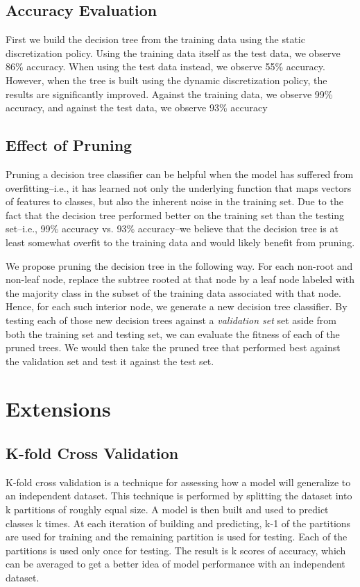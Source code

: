 \documentclass[12pt, conference, compsocconf]{IEEEtran}
\begin{document}
\subsection{Accuracy Evaluation}
First we build the decision tree from the training data using the static discretization policy. 
Using the training data itself as the test data, we observe 86\% accuracy.
When using the test data instead, we observe 55\% accuracy.
However, when the tree is built using the dynamic discretization policy, the results are significantly improved.
Against the training data, we observe 99\% accuracy, and against the test data, we observe 93\% accuracy

\subsection{Effect of Pruning}
Pruning a decision tree classifier can be helpful when the model has suffered from overfitting--i.e., it has learned not only the underlying function that maps vectors of features to classes, but also the inherent noise in the training set. 
Due to the fact that the decision tree performed better on the training set than the testing set--i.e., 99\% accuracy vs. 93\% accuracy--we believe that the decision tree is at least somewhat overfit to the training data and would likely benefit from pruning. 

We propose pruning the decision tree in the following way. 
For each non-root and non-leaf node, replace the subtree rooted at that node by a leaf node labeled with the majority class in the subset of the training data associated with that node. 
Hence, for each such interior node, we generate a new decision tree classifier.
By testing each of those new decision trees against a \emph{validation set} set aside from both the training set and testing set, we can evaluate the fitness of each of the pruned trees. 
We would then take the pruned tree that performed best against the validation set and test it against the test set. 

\section{Extensions}

\subsection{K-fold Cross Validation}
K-fold cross validation is a technique for assessing how a model will
generalize to an independent dataset.  This technique is performed by splitting
the dataset into k partitions of roughly equal size.  A model is then built and
used to predict classes k times.  At each iteration of building and predicting,
k-1 of the partitions are used for training and the remaining partition is used
for testing.  Each of the partitions is used only once for testing.  The result
is k scores of accuracy, which can be averaged to get a better idea of model
performance with an independent dataset.
\end{document}
